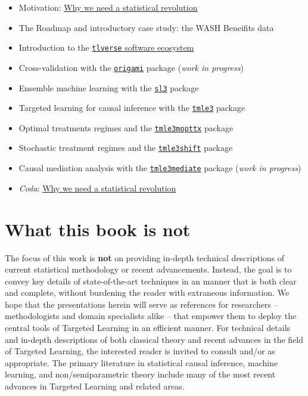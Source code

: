 \documentclass[12pt, krantz2,]{book}
\providecommand{\tightlist}{%
  \setlength{\itemsep}{0pt}\setlength{\parskip}{0pt}}
\theoremstyle{definition}
\theoremstyle{definition}
\theoremstyle{definition}
\newcommand{\1}{\mathbbm{1}}
\begin{document}
\begin{itemize}
\tightlist
\item
  Motivation: \href{https://senseaboutscienceusa.org/super-learning-and-the-revolution-in-knowledge/}{Why we need a statistical
  revolution}
\item
  The Roadmap and introductory case study: the WASH Beneifits data
\item
  Introduction to the \href{https://tlverse.org}{\texttt{tlverse} software
  ecosystem}
\item
  Cross-validation with the \href{https://github.com/tlverse/origami}{\texttt{origami}}
  package (\emph{work in progress})
\item
  Ensemble machine learning with the
  \href{https://github.com/tlverse/sl3}{\texttt{sl3}} package
\item
  Targeted learning for causal inference with the
  \href{https://github.com/tlverse/tmle3}{\texttt{tmle3}} package
\item
  Optimal treatments regimes and the
  \href{https://github.com/tlverse/tmle3mopttx}{\texttt{tmle3mopttx}} package
\item
  Stochastic treatment regimes and the
  \href{https://github.com/tlverse/tmle3shift}{\texttt{tmle3shift}} package
\item
  Causal mediation analysis with the
  \href{https://github.com/tlverse/tmle3mediate}{\texttt{tmle3mediate}} package
  (\emph{work in progress})
\item
  \emph{Coda}: \href{https://senseaboutscienceusa.org/super-learning-and-the-revolution-in-knowledge/}{Why we need a statistical
  revolution}
\end{itemize}

\hypertarget{what-this-book-is-not}{%
\section*{What this book is not}\label{what-this-book-is-not}}


The focus of this work is \textbf{not} on providing in-depth technical descriptions
of current statistical methodology or recent advancements. Instead, the goal is
to convey key details of state-of-the-art techniques in an manner that is both
clear and complete, without burdening the reader with extraneous information.
We hope that the presentations herein will serve as references for researchers
-- methodologists and domain specialists alike -- that empower them to deploy
the central tools of Targeted Learning in an efficient manner. For technical
details and in-depth descriptions of both classical theory and recent advances
in the field of Targeted Learning, the interested reader is invited to consult
\citet{vdl2011targeted} and/or \citet{vdl2018targeted} as appropriate. The primary literature
in statistical causal inference, machine learning, and non/semiparametric theory
include many of the most recent advances in Targeted Learning and related areas.
\end{document}
